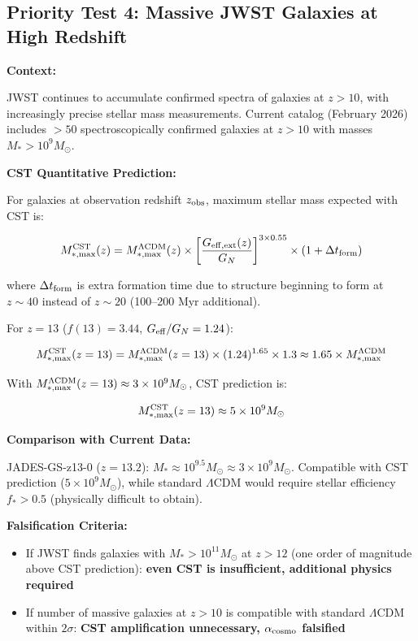 \documentclass[11pt,a4paper]{article}
\providecommand{\tightlist}{\setlength{\itemsep}{0pt}\setlength{\parskip}{0pt}}
\begin{document}
\hypertarget{priority-test-4-massive-jwst-galaxies-at-high-redshift}{%
\subsection{Priority Test 4: Massive JWST Galaxies at High
Redshift}\label{priority-test-4-massive-jwst-galaxies-at-high-redshift}}

\textbf{Context:}

JWST continues to accumulate confirmed spectra of galaxies at
\(z > 10\), with increasingly precise stellar mass measurements. Current
catalog (February 2026) includes \(> 50\) spectroscopically confirmed
galaxies at \(z > 10\) with masses \(M_* > 10^9 M_\odot\).

\textbf{CST Quantitative Prediction:}

For galaxies at observation redshift \(z_{\rm obs}\), maximum stellar
mass expected with CST is:

\[M_{*,\rm max}^{\rm CST}(z) = M_{*,\rm max}^{\Lambda{\rm CDM}}(z) \times \left[\frac{G_{\rm eff,ext}(z)}{G_N}\right]^{3 \times 0.55} \times \left(1 + \Delta t_{\rm form}\right)\]

where \(\Delta t_{\rm form}\) is extra formation time due to structure
beginning to form at \(z \sim 40\) instead of \(z \sim 20\) (100--200
Myr additional).

For \(z = 13\) (\(f(13) = 3.44\), \(G_{\rm eff}/G_N = 1.24\)):

\[M_{*,\rm max}^{\rm CST}(z=13) = M_{*,\rm max}^{\Lambda{\rm CDM}}(z=13) \times (1.24)^{1.65} \times 1.3 \approx 1.65 \times M_{*,\rm max}^{\Lambda{\rm CDM}}\]

With
\(M_{*,\rm max}^{\Lambda{\rm CDM}}(z=13) \approx 3\times10^9 M_\odot\),
CST prediction is:

\[M_{*,\rm max}^{\rm CST}(z=13) \approx 5\times10^9 M_\odot\]

\textbf{Comparison with Current Data:}

JADES-GS-z13-0 (\(z=13.2\)):
\(M_* \approx 10^{9.5} M_\odot \approx 3\times10^9 M_\odot\). Compatible
with CST prediction (\(5\times10^9 M_\odot\)), while standard
\(\Lambda\)CDM would require stellar efficiency \(f_* > 0.5\)
(physically difficult to obtain).

\textbf{Falsification Criteria:}

\begin{itemize}
\tightlist
\item
  If JWST finds galaxies with \(M_* > 10^{11} M_\odot\) at \(z > 12\)
  (one order of magnitude above CST prediction): \textbf{even CST is
  insufficient, additional physics required}
\item
  If number of massive galaxies at \(z > 10\) is compatible with
  standard \(\Lambda\)CDM within \(2\sigma\): \textbf{CST amplification
  unnecessary, \(\alpha_{\rm cosmo}\) falsified}
\end{itemize}
\end{document}
